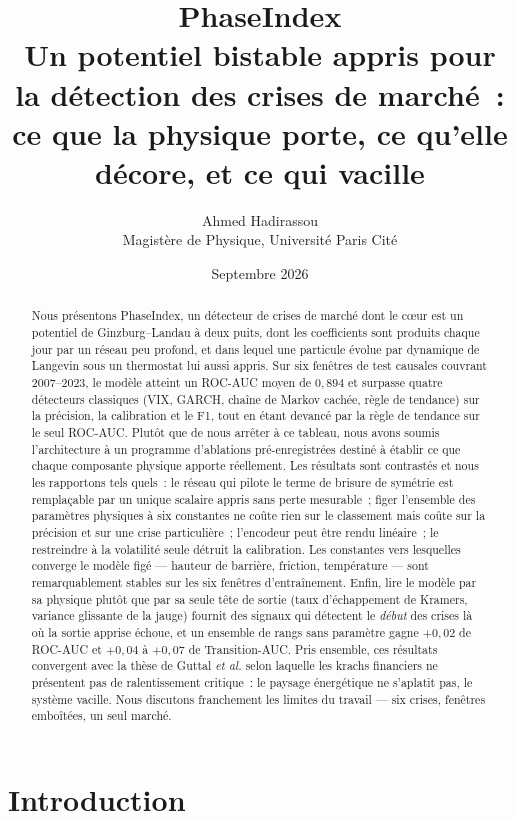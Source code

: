 \documentclass[11pt,a4paper]{article}
\title{\textbf{PhaseIndex}\\[4pt]\Large Un potentiel bistable appris pour la détection des crises de marché~:\\ ce que la physique porte, ce qu'elle décore, et ce qui vacille}
\author{Ahmed Hadirassou\\[2pt]\small Magistère de Physique, Université Paris Cité}
\date{Septembre 2026}
\begin{document}
\maketitle
\thispagestyle{fancy}

\begin{abstract}
\noindent
Nous présentons PhaseIndex, un détecteur de crises de marché dont le c\oe ur est un potentiel de Ginzburg--Landau à deux puits, dont les coefficients sont produits chaque jour par un réseau peu profond, et dans lequel une particule évolue par dynamique de Langevin sous un thermostat lui aussi appris. Sur six fenêtres de test causales couvrant 2007--2023, le modèle atteint un ROC-AUC moyen de $0{,}894$ et surpasse quatre détecteurs classiques (VIX, GARCH, chaîne de Markov cachée, règle de tendance) sur la précision, la calibration et le F1, tout en étant devancé par la règle de tendance sur le seul ROC-AUC. Plutôt que de nous arrêter à ce tableau, nous avons soumis l'architecture à un programme d'ablations pré-enregistrées destiné à établir ce que chaque composante physique apporte réellement. Les résultats sont contrastés et nous les rapportons tels quels~: le réseau qui pilote le terme de brisure de symétrie est remplaçable par un unique scalaire appris sans perte mesurable~; figer l'ensemble des paramètres physiques à six constantes ne coûte rien sur le classement mais coûte sur la précision et sur une crise particulière~; l'encodeur peut être rendu linéaire~; le restreindre à la volatilité seule détruit la calibration. Les constantes vers lesquelles converge le modèle figé --- hauteur de barrière, friction, température --- sont remarquablement stables sur les six fenêtres d'entraînement. Enfin, lire le modèle par sa physique plutôt que par sa seule tête de sortie (taux d'échappement de Kramers, variance glissante de la jauge) fournit des signaux qui détectent le \emph{début} des crises là où la sortie apprise échoue, et un ensemble de rangs sans paramètre gagne $+0{,}02$ de ROC-AUC et $+0{,}04$ à $+0{,}07$ de Transition-AUC. Pris ensemble, ces résultats convergent avec la thèse de Guttal \emph{et al.} selon laquelle les krachs financiers ne présentent pas de ralentissement critique~: le paysage énergétique ne s'aplatit pas, le système vacille. Nous discutons franchement les limites du travail --- six crises, fenêtres emboîtées, un seul marché.
\end{abstract}

\section{Introduction}
\end{document}
